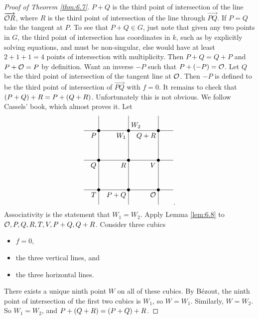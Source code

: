 \begin{proof}[Proof of Theorem \ref{thm:6.7}]
$ P + Q $ is the third point of intersection of the line $ \overrightarrow{\mathcal{O} R} $, where $ R $ is the third point of intersection of the line through $ \overrightarrow{PQ} $. If $ P = Q $ take the tangent at $ P $. To see that $ P + Q \in G $, just note that given any two points in $ G $, the third point of intersection has coordinates in $ k $, such as by explicitly solving equations, and must be non-singular, else would have at least $ 2 + 1 + 1 = 4 $ points of intersection with multiplicity. Then $ P + Q = Q + P $ and $ P + \mathcal{O} = P $ by definition. Want an inverse $ -P $ such that $ P + \br{-P} = \OOO $. Let $ Q $ be the third point of intersection of the tangent line at $ \mathcal{O} $. Then $ -P $ is defined to be the third point of intersection of $ \overrightarrow{PQ} $ with $ f = 0 $. It remains to check that $ \br{P + Q} + R = P + \br{Q + R} $. Unfortunately this is not obvious. We follow Cassels' book, which almost proves it. Let
$$
\begin{tikzpicture}[scale=1.5]
\fill (0, 0) circle (0.05) node[below left]{$ \OOO $};
\fill (-1, 0) circle (0.05) node[below left]{$ P + Q $};
\fill (-2, 0) circle (0.05) node[below left]{$ T $};
\fill (0, 1) circle (0.05) node[below left]{$ V $};
\fill (-1, 1) circle (0.05) node[below left]{$ R $};
\fill (-2, 1) circle (0.05) node[below left]{$ Q $};
\fill (0, 2) circle (0.05) node[below left]{$ Q + R $};
\fill (-1, 2) circle (0.05) node[below left]{$ W_1 $} node[above right]{$ W_2 $};
\fill (-2, 2) circle (0.05) node[below left]{$ P $};
\draw (0.5, 0) to (-2.5, 0);
\draw (0.5, 1) to (-2.5, 1);
\draw (0.5, 2) to (-2.5, 2);
\draw (0, -0.5) to (0, 2.5);
\draw (-1, -0.5) to (-1, 2.5);
\draw (-2, -0.5) to (-2, 2.5);
\end{tikzpicture}.
$$
Associativity is the statement that $ W_1 = W_2 $. Apply Lemma \ref{lem:6.8} to $ \mathcal{O}, P, Q, R, T, V, P + Q, Q + R $. Consider three cubics
\begin{itemize}
\item $ f = 0 $,
\item the three vertical lines, and
\item the three horizontal lines.
\end{itemize}
There exists a unique ninth point $ W $ on all of these cubics. By B\'ezout, the ninth point of intersection of the first two cubics is $ W_1 $, so $ W = W_1 $. Similarly, $ W = W_2 $. So $ W_1 = W_2 $, and $ P + \br{Q + R} = \br{P + Q} + R $.
\end{proof}

